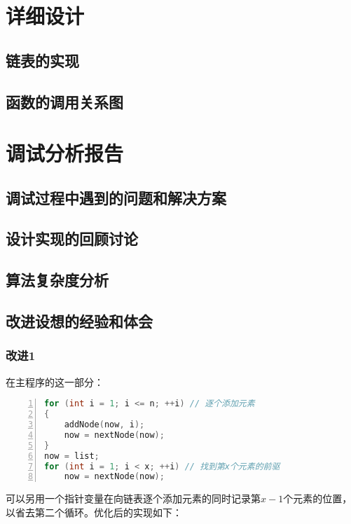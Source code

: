 \documentclass{article}
\begin{document}
\section{详细设计}

\subsection{链表的实现}

\subsection{函数的调用关系图}

\section{调试分析报告}

\subsection{调试过程中遇到的问题和解决方案}

\subsection{设计实现的回顾讨论}

\subsection{算法复杂度分析}

\subsection{改进设想的经验和体会}

\subsubsection{改进1}

在主程序的这一部分：

\begin{lstlisting}[language={C},
    numbers=left,
    numberstyle=\tiny\menlo,
    basicstyle=\small\menlo]
for (int i = 1; i <= n; ++i) // 逐个添加元素
{
    addNode(now, i);
    now = nextNode(now);
}
now = list;
for (int i = 1; i < x; ++i) // 找到第x个元素的前驱
    now = nextNode(now);
\end{lstlisting}

可以另用一个指针变量在向链表逐个添加元素的同时记录第$x-1$个元素的位置，以省去第二个循环。优化后的实现如下：
\end{document}
